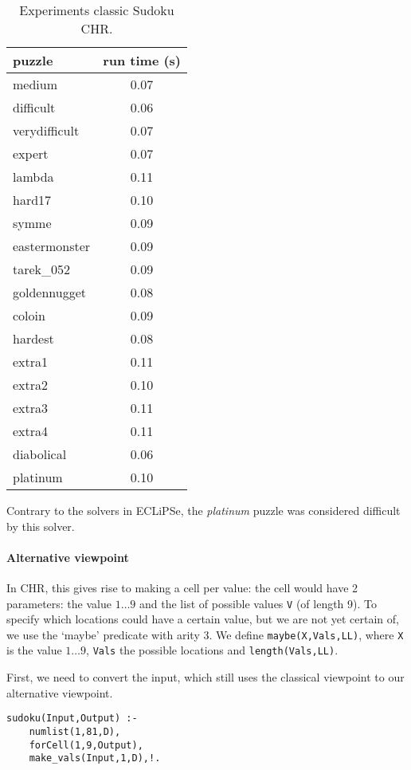 \begin{table}[hbpt] %
\centering
  \begin{tabular}{l S}
\toprule
puzzle & {run time (s)}  \\ \midrule
medium 		& 0.07\\
difficult 	& 0.06\\
verydifficult 	& 0.07\\
expert 		& 0.07\\
lambda 		& 0.11\\
hard17 		& 0.10\\
symme 		& 0.09\\
eastermonster 	& 0.09\\
tarek\_052  	& 0.09\\
goldennugget 	& 0.08\\
coloin 		& 0.09\\
hardest 	& 0.08\\
extra1  	& 0.11\\
extra2 		& 0.10\\
extra3 		& 0.11\\
extra4		& 0.11\\
diabolical      & 0.06\\
platinum        & 0.10\\
\bottomrule
  \end{tabular}
\caption{Experiments classic Sudoku CHR.}
\label{tab:classicchr}
\end{table}

Contrary to the solvers in ECLiPSe, the \emph{platinum} puzzle was considered difficult by this solver.

\paragraph{Alternative viewpoint}

In CHR, this gives rise to making a cell per value: the cell would have 2 parameters: the value $1\dots 9$ and the list of possible values \verb|V| (of length 9).  To specify which locations could have a certain value, but we are not yet certain of, we use the `maybe' predicate with arity 3. We define \verb|maybe(X,Vals,LL)|, where \verb|X| is the value $1\ldots 9$, \verb|Vals| the possible locations and \verb|length(Vals,LL)|.

First, we need to convert the input, which still uses the classical viewpoint to our alternative viewpoint.
\begin{lstlisting}
sudoku(Input,Output) :-
    numlist(1,81,D),
    forCell(1,9,Output),
    make_vals(Input,1,D),!.
\end{lstlisting}

